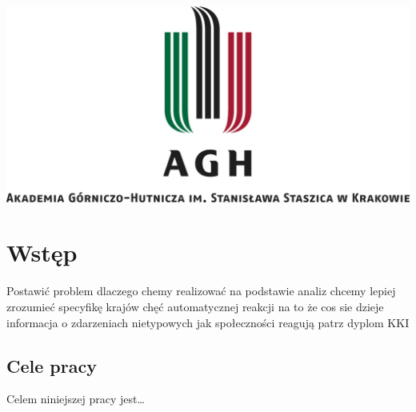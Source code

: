 \documentclass[11pt]{report}
\begin{document}
    \begin{titlepage}
        \centering
        \includegraphics[width=1 \textwidth]{fig/AGH.jpg}
        \vspace{0.03\textheight}
        \bigskip
        \vspace{0.2\textheight}
        \par

        \vspace{0.1\textheight}
    \end{titlepage}

    \tableofcontents


    \chapter{Wstęp}
    Postawić problem
    dlaczego chemy realizować
    na podstawie analiz chcemy lepiej zrozumieć specyfikę krajów
    chęć automatycznej reakcji na to że cos sie dzieje
    informacja o zdarzeniach nietypowych
    jak społeczności reagują
    patrz dyplom KKI


    \section{Cele pracy}
    Celem niniejszej pracy jest\ldots
\end{document}
